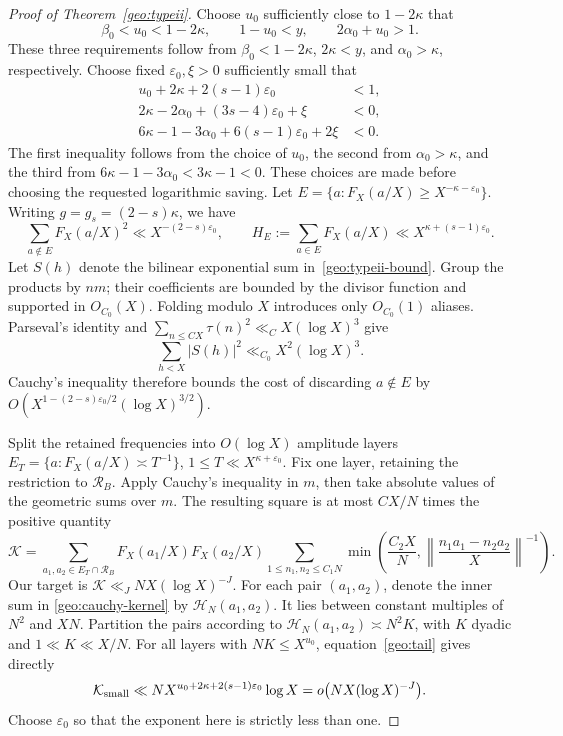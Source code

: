 \documentclass[11pt,a4paper]{article}
\theoremstyle{paperplain}
\numberwithin{equation}{section}
\begin{document}
\begin{proof}[Proof of Theorem~\ref{geo:typeii}]
Choose $u_0$ sufficiently close to $1-2\kappa$ that
\begin{equation}\label{geo:u-choice}
 \beta_0<u_0<1-2\kappa,\qquad 1-u_0<y,\qquad
 2\alpha_0+u_0>1.
\end{equation}
These three requirements follow from $\beta_0<1-2\kappa$,
$2\kappa<y$, and $\alpha_0>\kappa$, respectively.
Choose fixed $\varepsilon_0,\xi>0$ sufficiently small that
\begin{align*}
 u_0+2\kappa+2(s-1)\varepsilon_0&<1,\\
 2\kappa-2\alpha_0+(3s-4)\varepsilon_0+\xi&<0,\\
 6\kappa-1-3\alpha_0+6(s-1)\varepsilon_0+2\xi&<0.
\end{align*}
The first inequality follows from the choice of $u_0$, the second from
$\alpha_0>\kappa$, and the third from
$6\kappa-1-3\alpha_0<3\kappa-1<0$.
These choices are made before choosing the requested logarithmic saving.
Let
$E=\{a:F_X(a/X)\ge X^{-\kappa-\varepsilon_0}\}$.
Writing $g=g_s=(2-s)\kappa$, we have
\begin{equation}\label{geo:tail}
 \sum_{a\notin E}F_X(a/X)^2\ll X^{-(2-s)\varepsilon_0},
 \qquad H_E:=\sum_{a\in E}F_X(a/X)
 \ll X^{\kappa+(s-1)\varepsilon_0}.
\end{equation}
Let $S(h)$ denote the bilinear exponential sum in~\eqref{geo:typeii-bound}.
Group the products by $nm$; their coefficients are bounded by the divisor
function and supported in $O_{C_0}(X)$.
Folding modulo $X$ introduces only $O_{C_0}(1)$ aliases.
Parseval's identity and
$\sum_{n\le CX}\tau(n)^2\ll_CX(\log X)^3$ give
\[
 \sum_{h<X}|S(h)|^2\ll_{C_0}X^2(\log X)^3.
\]
Cauchy's inequality therefore bounds the cost of discarding $a\notin E$ by
$O(X^{1-(2-s)\varepsilon_0/2}(\log X)^{3/2})$.

Split the retained frequencies into $O(\log X)$ amplitude layers
$E_T=\{a:F_X(a/X)\asymp T^{-1}\}$,
$1\le T\ll X^{\kappa+\varepsilon_0}$.
Fix one layer, retaining the restriction to $\mathcal R_B$.
Apply Cauchy's inequality in $m$, then take absolute values of the geometric
sums over $m$. The resulting square is at most $CX/N$ times the positive quantity
\begin{equation}\label{geo:cauchy-kernel}
 \mathcal K=
 \sum_{a_1,a_2\in E_T\cap\mathcal R_B}F_X(a_1/X)F_X(a_2/X)
 \sum_{1\le n_1,n_2\le C_1N}
 \min\left(\frac{C_2X}{N},
 \left\|\frac{n_1a_1-n_2a_2}{X}\right\|^{-1}\right).
\end{equation}
Our target is $\mathcal K\ll_JNX(\log X)^{-J}$.
For each pair $(a_1,a_2)$, denote the inner sum in
\eqref{geo:cauchy-kernel} by $\mathscr H_N(a_1,a_2)$.
It lies between constant multiples of $N^2$ and $XN$.
Partition the pairs according to
$\mathscr H_N(a_1,a_2)\asymp N^2K$, with $K$ dyadic and
$1\ll K\ll X/N$.
For all layers with $NK\le X^{u_0}$, equation~\eqref{geo:tail} gives directly
\begin{equation}\label{geo:small-K}
 \mathcal K_{\rm small}
 \ll N X^{u_0+2\kappa+2(s-1)\varepsilon_0}\log X
 =o\bigl(NX(\log X)^{-J}\bigr).
\end{equation}
Choose $\varepsilon_0$ so that the exponent here is strictly less than one.


\end{proof}
\end{document}
